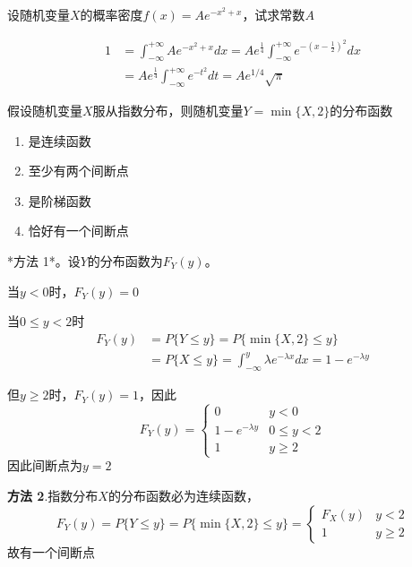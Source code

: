 \documentclass{article}
\begin{document}
\begin{examplle}[]
设随机变量\(X\)的概率密度\(f(x)=Ae^{-x^2+x}\)，试求常数\(A\)

\begin{align*}
1&=\int_{-\infty}^{+\infty}Ae^{-x^2+x}dx=Ae^{\frac{1}{4}}\int_{-\infty}^{+\infty}
e^{-(x-\frac{1}{2})^2}dx\\
&=Ae^{\frac{1}{4}}\int_{-\infty}^{+\infty}e^{-t^2}dt=Ae^{1/4}\sqrt{\pi}
\end{align*}
\end{examplle}

\begin{examplle}[]
假设随机变量\(X\)服从指数分布，则随机变量\(Y=\min\{X,2\}\)的分布函数
\begin{enumerate}
\item 是连续函数
\item 至少有两个间断点
\item 是阶梯函数
\item 恰好有一个间断点
\end{enumerate}


*方法 1*。设\(Y\)的分布函数为\(F_Y(y)\)。

当\(y<0\)时，\(F_Y(y)=0\)

当\(0\le y<2\)时
\begin{align*}
F_Y(y)&=P\{Y\le y\}=P\{\min\{X,2\}\le y\}\\
&=P\{X\le y\}=\int_{-\infty}^y\lambda e^{-\lambda x}dx=1-e^{-\lambda y}
\end{align*}

但\(y\ge2\)时，\(F_Y(y)=1\)，因此
\begin{equation*}
F_Y(y)=
\begin{cases}
0&y<0\\
1-e^{-\lambda y}&0\le y<2\\
1&y\ge2
\end{cases}
\end{equation*}
因此间断点为\(y=2\)

\textbf{方法 2}.指数分布\(X\)的分布函数必为连续函数，
\begin{equation*}
F_Y(y)=P\{Y\le y\}=P\{\min\{X,2\}\le y\}=
\begin{cases}
F_X(y)&y<2\\
1&y\ge2
\end{cases}
\end{equation*}
故有一个间断点
\end{examplle}
\end{document}
